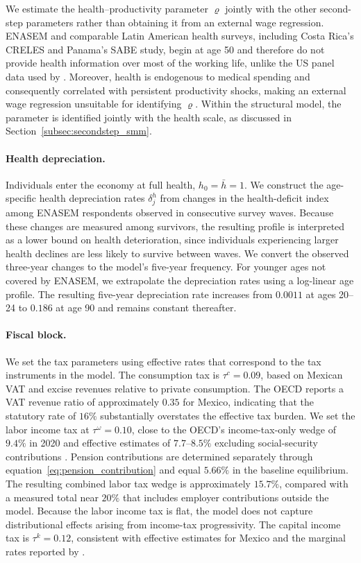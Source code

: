 \documentclass[12pt,a4paper]{article}
\begin{document}
We estimate the health--productivity parameter $\varrho$ jointly with the other second-step parameters rather than obtaining it from an external wage regression. ENASEM and comparable Latin American health surveys, including Costa Rica's CRELES and Panama's SABE study, begin at age 50 and therefore do not provide health information over most of the working life, unlike the US panel data used by \citet{HosseiniKopeckyZhao}. Moreover, health is endogenous to medical spending and consequently correlated with persistent productivity shocks, making an external wage regression unsuitable for identifying $\varrho$. Within the structural model, the parameter is identified jointly with the health scale, as discussed in Section~\ref{subsec:secondstep_smm}.

\paragraph{Health depreciation.}
Individuals enter the economy at full health, $h_0=\bar h=1$. We construct the age-specific health depreciation rates $\delta_j^h$ from changes in the health-deficit index among ENASEM respondents observed in consecutive survey waves. Because these changes are measured among survivors, the resulting profile is interpreted as a lower bound on health deterioration, since individuals experiencing larger health declines are less likely to survive between waves. We convert the observed three-year changes to the model's five-year frequency. For younger ages not covered by ENASEM, we extrapolate the depreciation rates using a log-linear age profile. The resulting five-year depreciation rate increases from $0.0011$ at ages 20--24 to $0.186$ at age 90 and remains constant thereafter.

\paragraph{Fiscal block.}
We set the tax parameters using effective rates that correspond to the tax instruments in the model. The consumption tax is $\tau^c=0.09$, based on Mexican VAT and excise revenues relative to private consumption. The OECD reports a VAT revenue ratio of approximately $0.35$ for Mexico, indicating that the statutory rate of $16\%$ substantially overstates the effective tax burden. We set the labor income tax at $\tau^\omega=0.10$, close to the OECD's income-tax-only wedge of $9.4\%$ in 2020 and effective estimates of $7.7$--$8.5\%$ excluding social-security contributions \citep{BachasFisherPostJensenZucman2022}. Pension contributions are determined separately through equation~\eqref{eq:pension_contribution} and equal $5.66\%$ in the baseline equilibrium. The resulting combined labor tax wedge is approximately $15.7\%$, compared with a measured total near $20\%$ that includes employer contributions outside the model. Because the labor income tax is flat, the model does not capture distributional effects arising from income-tax progressivity. The capital income tax is $\tau^k=0.12$, consistent with effective estimates for Mexico \citep[$0.108$--$0.121$;][]{BachasFisherPostJensenZucman2022} and the marginal rates reported by \citet{Anton2005}.
\end{document}
